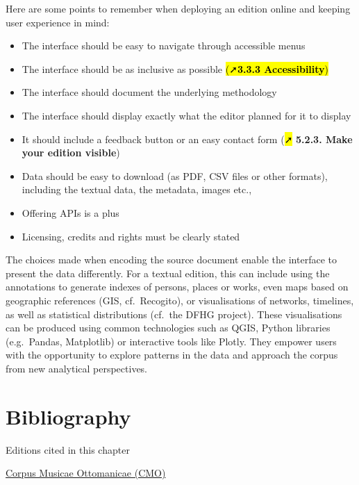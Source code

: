 \documentclass[
  letterpaper,
  DIV=11,
  numbers=noendperiod]{scrreprt}
\begin{document}
Here are some points to remember when deploying an edition online and
keeping user experience in mind:

\begin{itemize}
\item
  The interface should be easy to navigate through accessible menus
\item
  The interface should be as inclusive as possible \hl{(➚\textbf{3.3.3
  Accessibility})}
\item
  The interface should document the underlying methodology
\item
  The interface should display exactly what the editor planned for it to
  display
\end{itemize}

\begin{itemize}
\item
  It should include a feedback button or an easy contact form (\hl{➚}
  \textbf{5.2.3. Make your edition visible})
\item
  Data should be easy to download (as PDF, CSV files or other formats),
  including the textual data, the metadata, images etc.,
\item
  Offering APIs is a plus
\item
  Licensing, credits and rights must be clearly stated
\end{itemize}

The choices made when encoding the source document enable the interface
to present the data differently. For a textual edition, this can include
using the annotations to generate indexes of persons, places or works,
even maps based on geographic references (GIS, cf.~Recogito), or
visualisations of networks, timelines, as well as statistical
distributions (cf.~the DFHG project). These visualisations can be
produced using common technologies such as QGIS, Python libraries
(e.g.~Pandas, Matplotlib) or interactive tools like Plotly. They empower
users with the opportunity to explore patterns in the data and approach
the corpus from new analytical perspectives.

\section{Bibliography}\label{bibliography-3}

Editions cited in this chapter

\href{https://corpus-musicae-ottomanicae.de/content/index.xml?lang=en}{Corpus
Musicae Ottomanicae (CMO)}
\end{document}
